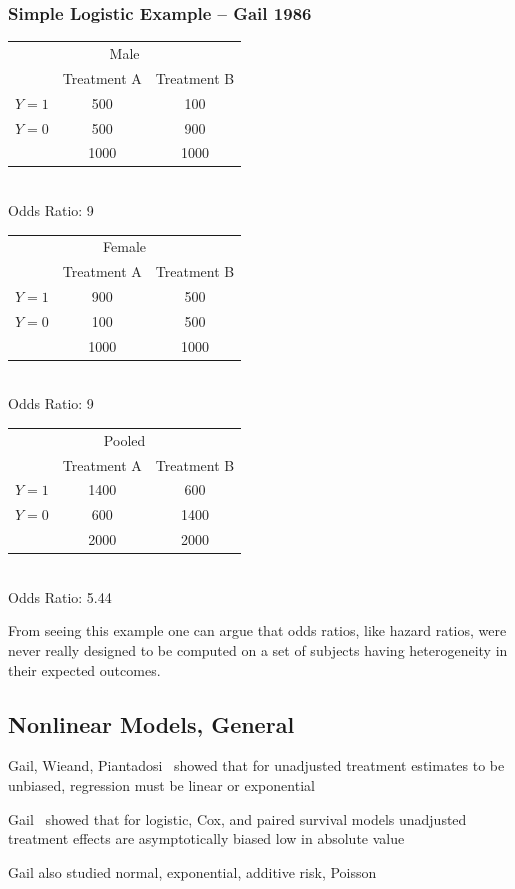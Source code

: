 \subsubsection{Simple Logistic Example -- Gail 1986}
\newcommand{\subtab}[8]{\begin{center}\begin{tabular}{l|c|c|}
    \multicolumn{3}{c}{#1} \\
    & Treatment A   & Treatment B \\ \hline
    $Y=1$ & #2 & #3 \\ \hline
    $Y=0$ & #4 & #5 \\ \hline
          & #7 & #8 \\
    \end{tabular}
    \\ Odds Ratio: #6
    \end{center}}
\subtab{Male}{500}{100}{500}{900}{9}{1000}{1000}
\subtab{Female}{900}{500}{100}{500}{9}{1000}{1000}
\subtab{Pooled}{1400}{600}{600}{1400}{5.44}{2000}{2000}

From seeing this example one can argue that odds ratios, like hazard
ratios, were never really designed to be computed on a set of subjects
having heterogeneity in their expected outcomes.

\subsection{Nonlinear Models, General}
\bi
\item   Gail, Wieand, Piantadosi~\cite{gai84bia} showed that for unadjusted
        treatment estimates to be unbiased, regression must be linear
        or exponential
\item   Gail~\cite{gai86adj} showed that for logistic, Cox, and paired survival
        models unadjusted treatment effects are asymptotically biased
        low in absolute value
\item   Gail also studied normal, exponential, additive risk, Poisson
\ei
{}


